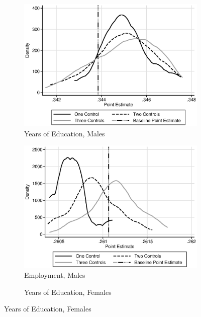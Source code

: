 \begin{figure}
\centering
\caption{Sensitiviy to Choice of Control Set, Treatment vs. Alternative Preschool}\label{fig:senstap}
\begin{subfigure}[h]{0.4\textwidth}
		\centering
		\caption{Years of Education, Males}
		\includegraphics[width=\textwidth]{output/sencontrols_male_years_30y_epan_ipw_P1.eps}
\end{subfigure}%
\begin{subfigure}[h]{0.4\textwidth}
	\centering
	\caption{Employment, Males}
		\includegraphics[width=\textwidth]{output/sencontrols_male_si30y_works_epan_ipw_P1.eps}
\end{subfigure}
\begin{subfigure}[h]{0.4\textwidth}
		\centering
		\caption{Years of Education, Females}

\end{subfigure}
\end{figure}
